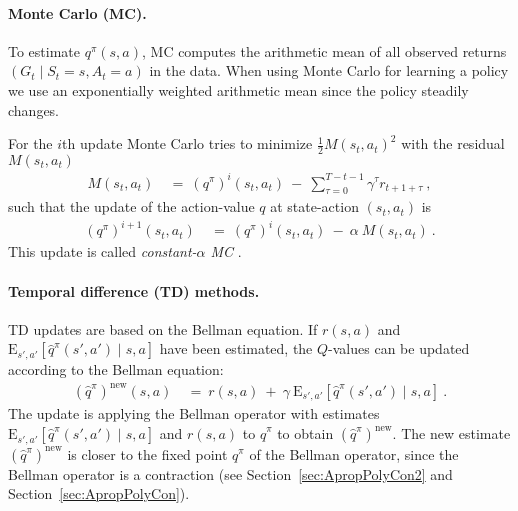 \documentclass{article}
\newcommand\EXP{\mathbf{\mathrm{E}}}
\newcommand\nn{\mathrm{new}}
\begin{document}
\begin{appendices}
\paragraph{Monte Carlo (MC).}
To estimate $q^\pi(s,a)$, MC computes the arithmetic mean of all observed
returns $(G_t \mid S_t=s,A_t=a)$ in the data.
When using Monte Carlo for learning a policy we use an 
exponentially weighted arithmetic mean since the policy steadily changes.

For the $i$th update Monte Carlo tries to minimize $\frac{1}{2}M(s_t,a_t)^2$ with the residual $M(s_t,a_t)$
\begin{align}
\label{eq:mc-error}
  M(s_t,a_t) \ &= \ (q^\pi)^i(s_t,a_t) \ - \
   \sum_{\tau=0}^{T-t-1} \gamma^{\tau}  r_{t+1+\tau} \ ,
\end{align}
such that the update of the action-value $q$ at state-action $(s_t,a_t)$ is
\begin{align}
\label{eq:AMCpolicy}
 (q^\pi)^{i+1}(s_t,a_t) \ &= \ (q^\pi)^i(s_t,a_t) \ - \
 \alpha \ M(s_t,a_t) \ .
\end{align} 
This update is called {\em constant-$\alpha$ MC} \cite{Sutton:18book}.
 
\paragraph{Temporal difference (TD) methods.}
TD updates are based on the Bellman equation.
If $r(s,a)$ and
$\EXP_{s',a'} \left[\hat{q}^\pi(s', a') \mid s,a\right]$ have been estimated,
the $Q$-values can be updated according to the Bellman equation:
\begin{align}
  \left(\hat{q}^\pi\right)^{\nn}(s,a) \ &= \
  r(s,a) \ + \ \gamma \
  \EXP_{s',a'} \left[\hat{q}^\pi(s', a') \mid s,a\right]\ . 
\end{align}
The update is applying the Bellman operator with estimates
$\EXP_{s',a'} \left[\hat{q}^\pi(s', a') \mid s,a\right]$ and
$r(s,a)$ to $\hat{q}^\pi$ to obtain
$\left(\hat{q}^\pi\right)^{\nn}$.
The new estimate $\left(\hat{q}^\pi\right)^{\nn}$ is closer to
the fixed point $q^\pi$ of the Bellman operator,
since the Bellman operator is a contraction
(see Section~\ref{sec:ApropPolyCon2}
and Section~\ref{sec:ApropPolyCon}).


\end{appendices}
\end{document}
